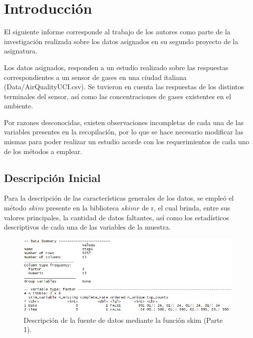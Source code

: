 \documentclass[a4paper,10pt,twocolumn]{article}
\begin{document}
\section{Introducción}
  El siguiente informe corresponde al trabajo de los autores como parte de la investigación realizada sobre los datos asignados en su segundo proyecto de la asignatura.
  
  Los datos asignados, responden a un estudio realizado sobre las respuestas correspondientes a un sensor de gases en una ciudad italiana (Data/AirQualityUCI.csv). Se tuvieron en cuenta las respuestas de los distintos terminales del sensor, así como las concentraciones de gases existentes en el ambiente.
  
  Por razones desconocidas, existen observaciones incompletas de cada una de las variables presentes en la recopilación, por lo que se hace necesario modificar las mismas para poder realizar un estudio acorde con los requerimientos de cada uno de los métodos a emplear.
  


\subsection{Descripción Inicial}
  
  Para la descripción de las características generales de los datos, se empleó el método $skim$ presente en la biblioteca $skimr$ de r, el cual brinda, entre sus valores principales, la cantidad de datos faltantes, así como los estadísticos descriptivos de cada una de las variables de la muestra. 
  
  \begin{figure}[htb]%
  	\begin{center}
  		\includegraphics[width=\linewidth]{Images/skim1p1.png}
  	\end{center}
  	\caption{Descripción de la fuente de datos mediante la función skim (Parte 1).}
  	\label{fig:skim1p1}
  \end{figure}
\end{document}
